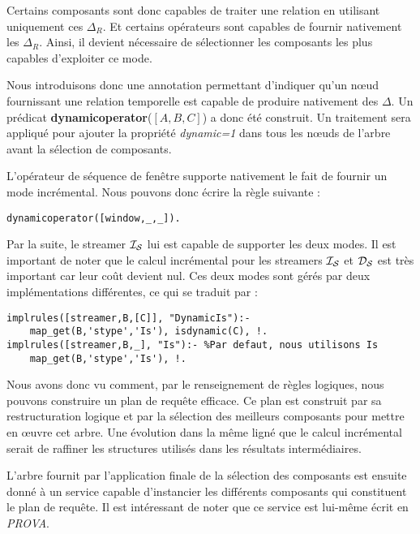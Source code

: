 Certains composants sont donc capables de traiter une relation en utilisant uniquement ces $\Delta_R$. Et certains opérateurs sont capables de fournir nativement les $\Delta_R$. Ainsi, il devient nécessaire de sélectionner les composants les plus capables d'exploiter ce mode.

Nous introduisons donc une annotation permettant d'indiquer qu'un nœud fournissant une relation temporelle est capable de produire nativement des $\Delta$. Un prédicat \textbf{dynamicoperator}($[A,B,C]$) a donc été construit. Un traitement sera appliqué pour ajouter la propriété \textit{dynamic=1} dans tous les nœuds de l'arbre avant la sélection de composants.
\begin{example}
L'opérateur de séquence de fenêtre supporte nativement le fait de fournir un mode incrémental. Nous pouvons donc écrire la règle suivante :
\begin{lstlisting}
dynamicoperator([window,_,_]).
\end{lstlisting}

Par la suite, le streamer $\mathcal{I_S}$ lui est capable de supporter les deux modes. Il est important de noter que le calcul incrémental pour les streamers $\mathcal{I_S}$ et $\mathcal{D_S}$ est très important car leur coût devient nul. Ces deux modes sont gérés par deux implémentations différentes, ce qui se traduit par :
\begin{lstlisting}
implrules([streamer,B,[C]], "DynamicIs"):-
    map_get(B,'stype','Is'), isdynamic(C), !.
implrules([streamer,B,_], "Is"):- %Par defaut, nous utilisons Is
    map_get(B,'stype','Is'), !.
\end{lstlisting}
\end{example}

Nous avons donc vu comment, par le renseignement de règles logiques, nous pouvons construire un plan de requête efficace. Ce plan est construit par sa restructuration logique et par la sélection des meilleurs composants pour mettre en œuvre cet arbre. Une évolution dans la même ligné que le calcul incrémental serait de raffiner les structures utilisés dans les résultats intermédiaires.

L'arbre fournit par l'application finale de la sélection des composants est ensuite donné à un service capable d'instancier les différents composants qui constituent le plan de requête. Il est intéressant de noter que ce service est lui-même écrit en \textit{PROVA}.

